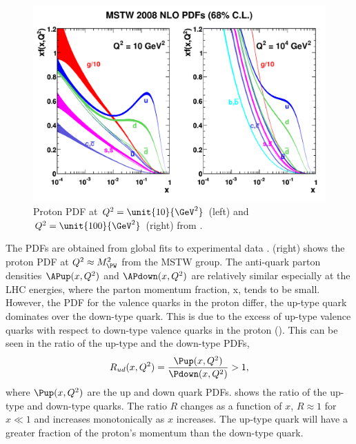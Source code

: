 \begin{figure}[htbp]
  \centering
  \includegraphics[width=\textwidth]{mstw2008nlo68cl_allpdfs}
  \caption[Proton PDF at  $ Q^2 = \unit{ 10  }{\GeV^2} $ and $ Q^2 = \unit{ 100
}{\GeV^2} $.] {Proton PDF at  $ Q^2 = \unit{ 10  }{\GeV^2} $ (left) and $ Q^2 =
\unit{ 100  }{\GeV^2} $ (right) from \cite{martin2009parton}.}
  \label{wbos:pdf}
\end{figure}

The {PDFs} are obtained from global fits to experimental data
\cite{martin2009parton}.   (right) shows the proton PDF at
$Q^2\approx M_{\PW}^2$ from the MSTW group.  The anti-quark parton densities
$\APup(x,Q^2)$ and $\APdown(x,Q^2)$ are relatively similar especially at the LHC
energies, where the parton momentum fraction, x, tends to be small.
However, the {PDF} for the valence quarks in the proton differ, 
the up-type quark dominates over the down-type quark.
This is due to the excess of up-type valence quarks with respect to down-type
valence quarks in the proton (\HepProcess{\Pup\Pup\Pdown}). 
This can be seen in the ratio of the up-type and the down-type {PDFs},
\begin{equation}
  R_{ud}(x,Q^2) = \frac{\Pup(x,Q^2)}{ \Pdown(x,Q^2)} > 1,
\end{equation}
where $\Pup(x,Q^2)$ are the up and down quark {PDFs}.
 shows the ratio of the up-type and down-type
quarks.  The ratio $R$ changes as a function of $x$, $R \approx 1$ for $x \ll 1$
and increases monotonically as $x$ increases.  The up-type quark will have a
greater fraction of the proton's momentum than the down-type quark.

